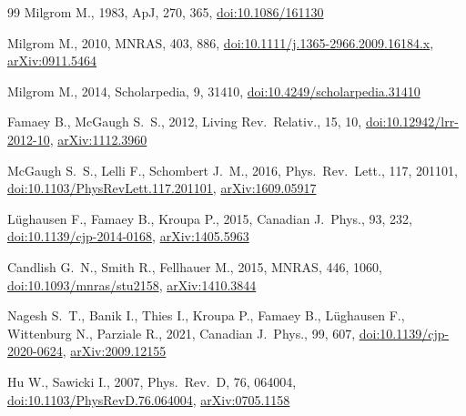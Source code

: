 \documentclass[fleqn,usenatbib]{mnras}
\begin{document}
\begin{thebibliography}{99}
Milgrom M., 1983, ApJ, 270, 365,
\href{https://doi.org/10.1086/161130}{doi:10.1086/161130}

Milgrom M., 2010, MNRAS, 403, 886,
\href{https://doi.org/10.1111/j.1365-2966.2009.16184.x}{doi:10.1111/j.1365-2966.2009.16184.x},
\href{https://arxiv.org/abs/0911.5464}{arXiv:0911.5464}

Milgrom M., 2014, Scholarpedia, 9, 31410,
\href{https://doi.org/10.4249/scholarpedia.31410}{doi:10.4249/scholarpedia.31410}

Famaey B., McGaugh S.~S., 2012, Living Rev.\ Relativ., 15, 10,
\href{https://doi.org/10.12942/lrr-2012-10}{doi:10.12942/lrr-2012-10},
\href{https://arxiv.org/abs/1112.3960}{arXiv:1112.3960}

McGaugh S.~S., Lelli F., Schombert J.~M., 2016, Phys.\ Rev.\ Lett., 117, 201101,
\href{https://doi.org/10.1103/PhysRevLett.117.201101}{doi:10.1103/PhysRevLett.117.201101},
\href{https://arxiv.org/abs/1609.05917}{arXiv:1609.05917}

L{\"u}ghausen F., Famaey B., Kroupa P., 2015, Canadian J.\ Phys., 93, 232,
\href{https://doi.org/10.1139/cjp-2014-0168}{doi:10.1139/cjp-2014-0168},
\href{https://arxiv.org/abs/1405.5963}{arXiv:1405.5963}

Candlish G.~N., Smith R., Fellhauer M., 2015, MNRAS, 446, 1060,
\href{https://doi.org/10.1093/mnras/stu2158}{doi:10.1093/mnras/stu2158},
\href{https://arxiv.org/abs/1410.3844}{arXiv:1410.3844}

Nagesh S.~T., Banik I., Thies I., Kroupa P., Famaey B., L{\"u}ghausen F., Wittenburg N., Parziale R., 2021, Canadian J.\ Phys., 99, 607,
\href{https://doi.org/10.1139/cjp-2020-0624}{doi:10.1139/cjp-2020-0624},
\href{https://arxiv.org/abs/2009.12155}{arXiv:2009.12155}


Hu W., Sawicki I., 2007, Phys.\ Rev.\ D, 76, 064004,
\href{https://doi.org/10.1103/PhysRevD.76.064004}{doi:10.1103/PhysRevD.76.064004},
\href{https://arxiv.org/abs/0705.1158}{arXiv:0705.1158}


\end{thebibliography}
\end{document}
